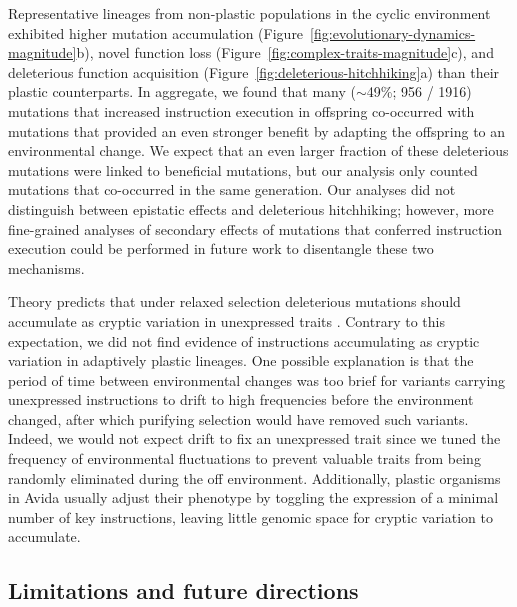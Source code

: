 \documentclass[utf8]{frontiersSCNS} %
\begin{document}
\begin{raggedbottom}
Representative lineages from non-plastic populations in the cyclic environment exhibited higher mutation accumulation (Figure~\ref{fig:evolutionary-dynamics-magnitude}b), novel function loss (Figure~\ref{fig:complex-traits-magnitude}c), and deleterious function acquisition (Figure~\ref{fig:deleterious-hitchhiking}a) than their plastic counterparts.
In aggregate, we found that many ($\sim$49\%; 956 / 1916) mutations that increased  instruction execution in offspring co-occurred with mutations that provided an even stronger benefit by adapting the offspring to an environmental change.
We expect that an even larger fraction of these deleterious mutations were linked to beneficial mutations, but our analysis only counted mutations that co-occurred in the same generation.
Our analyses did not distinguish between epistatic effects and deleterious hitchhiking; however, more fine-grained analyses of secondary effects of mutations that conferred  instruction execution could be performed in future work to disentangle these two mechanisms.


Theory predicts that under relaxed selection deleterious mutations should accumulate as cryptic variation in unexpressed traits \citep{lahti_relaxed_2009}.
Contrary to this expectation, we did not find evidence of  instructions accumulating as cryptic variation in adaptively plastic lineages.
One possible explanation is that the period of time between environmental changes was too brief for variants carrying unexpressed  instructions to drift to high frequencies before the environment changed, after which purifying selection would have removed such variants.
Indeed, we would not expect drift to fix an unexpressed trait since we tuned the frequency of environmental fluctuations to prevent valuable traits from being randomly eliminated during the off environment.
Additionally, plastic organisms in Avida usually adjust their phenotype by toggling the expression of a minimal number of key instructions, leaving little genomic space for cryptic variation to accumulate.

\subsection{Limitations and future directions}


\end{raggedbottom}
\end{document}
